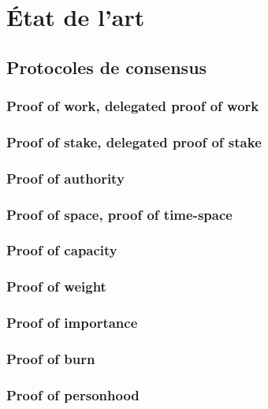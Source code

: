 \chapter{État de l'art}
\label{ch:etat_art}

\section{Protocoles de consensus}

\subsection{Proof of work, delegated proof of work}

\subsection{Proof of stake, delegated proof of stake}

\subsection{Proof of authority}

\subsection{Proof of space, proof of time-space}

\subsection{Proof of capacity}

\subsection{Proof of weight}

\subsection{Proof of importance}

\subsection{Proof of burn}

\subsection{Proof of personhood}

